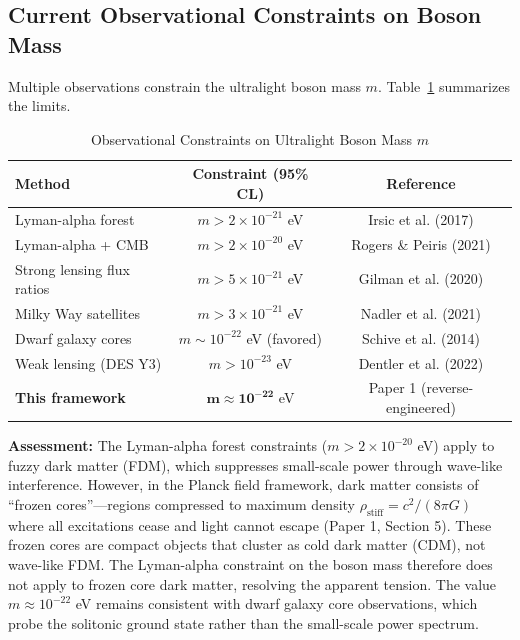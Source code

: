 \documentclass[11pt,a4paper]{article}
\newcommand{\rhostiff}{\ensuremath{\rho_{\mathrm{stiff}}}}
\theoremstyle{definition}
\theoremstyle{remark}
\begin{document}
\subsection{Current Observational Constraints on Boson Mass}
\label{sec:mass_constraints}

Multiple observations constrain the ultralight boson mass $m$. Table~\ref{tab:mass_constraints} summarizes the limits.

\begin{table}[H]
\centering
\caption{Observational Constraints on Ultralight Boson Mass $m$}
\label{tab:mass_constraints}
\begin{tabular}{@{}lcc@{}}
\toprule
\textbf{Method} & \textbf{Constraint (95\% CL)} & \textbf{Reference} \\
\midrule
Lyman-alpha forest & $m > 2 \times 10^{-21}$ eV & Irsic et al. (2017) \\
Lyman-alpha + CMB & $m > 2 \times 10^{-20}$ eV & Rogers \& Peiris (2021) \\
Strong lensing flux ratios & $m > 5 \times 10^{-21}$ eV & Gilman et al. (2020) \\
Milky Way satellites & $m > 3 \times 10^{-21}$ eV & Nadler et al. (2021) \\
Dwarf galaxy cores & $m \sim 10^{-22}$ eV (favored) & Schive et al. (2014) \\
Weak lensing (DES Y3) & $m > 10^{-23}$ eV & Dentler et al. (2022) \\
\midrule
\textbf{This framework} & $\mathbf{m \approx 10^{-22}}$ eV & Paper 1 (reverse-engineered) \\
\bottomrule
\end{tabular}
\end{table}

\textbf{Assessment:} The Lyman-alpha forest constraints ($m > 2 \times 10^{-20}$ eV) apply to fuzzy dark matter (FDM), which suppresses small-scale power through wave-like interference. However, in the Planck field framework, dark matter consists of ``frozen cores''---regions compressed to maximum density $\rhostiff = c^2/(8\pi G)$ where all excitations cease and light cannot escape (Paper 1, Section 5). These frozen cores are compact objects that cluster as cold dark matter (CDM), not wave-like FDM. The Lyman-alpha constraint on the boson mass therefore does not apply to frozen core dark matter, resolving the apparent tension. The value $m \approx 10^{-22}$ eV remains consistent with dwarf galaxy core observations, which probe the solitonic ground state rather than the small-scale power spectrum.
\end{document}

